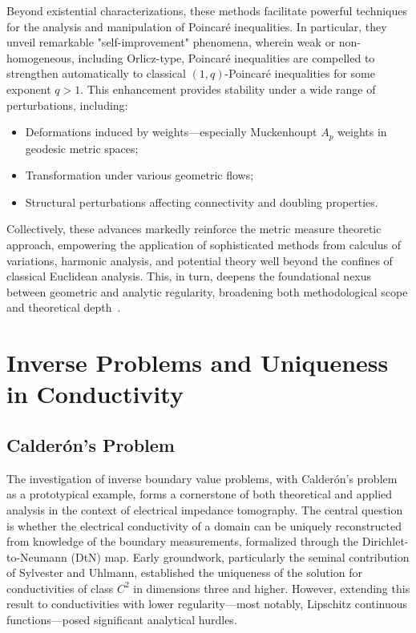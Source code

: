 \documentclass[11pt]{article}
\begin{document}
Beyond existential characterizations, these methods facilitate powerful techniques for the analysis and manipulation of Poincaré inequalities. In particular, they unveil remarkable "self-improvement" phenomena, wherein weak or non-homogeneous, including Orlicz-type, Poincaré inequalities are compelled to strengthen automatically to classical $(1, q)$-Poincaré inequalities for some exponent $q > 1$. This enhancement provides stability under a wide range of perturbations, including:

\begin{itemize}
    \item Deformations induced by weights—especially Muckenhoupt $A_p$ weights in geodesic metric spaces;
    \item Transformation under various geometric flows;
    \item Structural perturbations affecting connectivity and doubling properties.
\end{itemize}

Collectively, these advances markedly reinforce the metric measure theoretic approach, empowering the application of sophisticated methods from calculus of variations, harmonic analysis, and potential theory well beyond the confines of classical Euclidean analysis. This, in turn, deepens the foundational nexus between geometric and analytic regularity, broadening both methodological scope and theoretical depth~\cite{ref93}.

\section{Inverse Problems and Uniqueness in Conductivity}

\subsection{Calderón's Problem}

The investigation of inverse boundary value problems, with Calderón's problem as a prototypical example, forms a cornerstone of both theoretical and applied analysis in the context of electrical impedance tomography. The central question is whether the electrical conductivity of a domain can be uniquely reconstructed from knowledge of the boundary measurements, formalized through the Dirichlet-to-Neumann (DtN) map. Early groundwork, particularly the seminal contribution of Sylvester and Uhlmann, established the uniqueness of the solution for conductivities of class $C^2$ in dimensions three and higher. However, extending this result to conductivities with lower regularity—most notably, Lipschitz continuous functions—posed significant analytical hurdles.
\end{document}
